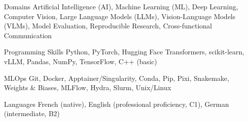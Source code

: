

\begin{cvskills}

  \cvskill
    {Domains} %
    {Artificial Intelligence (AI), Machine Learning (ML), Deep Learning, Computer Vision, Large Language Models (LLMs), Vision-Language Models (VLMs), Model Evaluation, Reproducible Research, Cross-functional Communication} %

  \cvskill
    {Programming Skills} %
    {Python, PyTorch, Hugging Face Transformers, scikit-learn, vLLM, Pandas, NumPy, TensorFlow, C++ (basic)} %

  \cvskill
    {MLOps} %
    {Git, Docker, Apptainer/Singularity, Conda, Pip, Pixi, Snakemake, Weights \& Biases, MLFlow, Hydra, Slurm, Unix/Linux} %

  \cvskill
    {Languages} %
    {French (native), English (professional proficiency, C1), German (intermediate, B2)} %

\end{cvskills}
